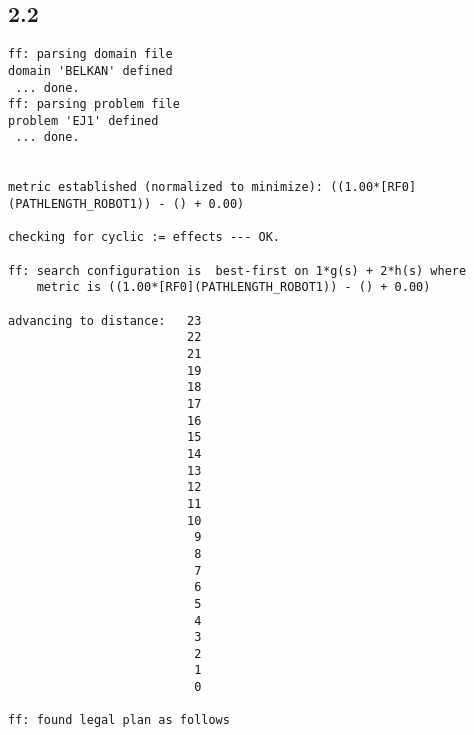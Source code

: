 \documentclass{article}
\begin{document}
\subsection*{2.2}
\begin{lstlisting}
ff: parsing domain file
domain 'BELKAN' defined
 ... done.
ff: parsing problem file
problem 'EJ1' defined
 ... done.


metric established (normalized to minimize): ((1.00*[RF0](PATHLENGTH_ROBOT1)) - () + 0.00)

checking for cyclic := effects --- OK.

ff: search configuration is  best-first on 1*g(s) + 2*h(s) where
    metric is ((1.00*[RF0](PATHLENGTH_ROBOT1)) - () + 0.00)

advancing to distance:   23
                         22
                         21
                         19
                         18
                         17
                         16
                         15
                         14
                         13
                         12
                         11
                         10
                          9
                          8
                          7
                          6
                          5
                          4
                          3
                          2
                          1
                          0

ff: found legal plan as follows


\end{lstlisting}
\end{document}
